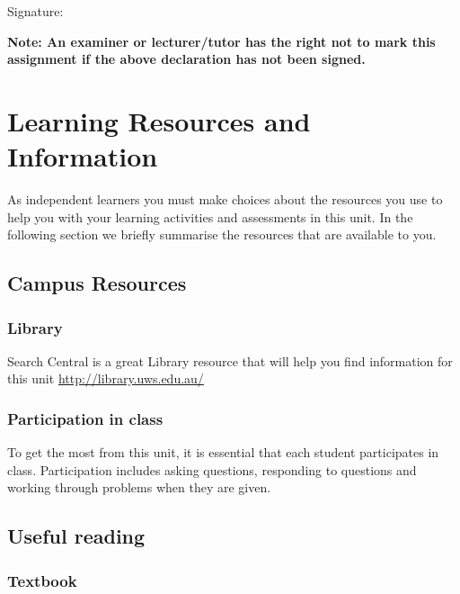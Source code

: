 \documentclass[a4paper,oneside]{book}
\begin{document}
\vspace{1em}
\noindent
Signature: \makebox[3in]{\hrulefill}

\vspace{1em}
\noindent
\textbf{Note: An examiner or lecturer/tutor has the right not to mark this
assignment if the above declaration has not been signed.}


\newpage

\chapter{Learning Resources and Information}

As independent learners you must make choices about the resources you
use to help you with your learning activities and assessments in this
unit.  In the following section we briefly summarise the resources
that are available to you.

\section{Campus Resources}


\subsection*{Library}
\label{sec:library}
Search Central is a great Library resource that will help you find
information for this unit \url{http://library.uws.edu.au/}



\subsection*{Participation in class}

To get the most from this unit, it is essential that each student
participates in class. Participation includes asking questions,
responding to questions and working through problems when they are
given.

\section{Useful reading}

\subsection*{Textbook}
\end{document}
